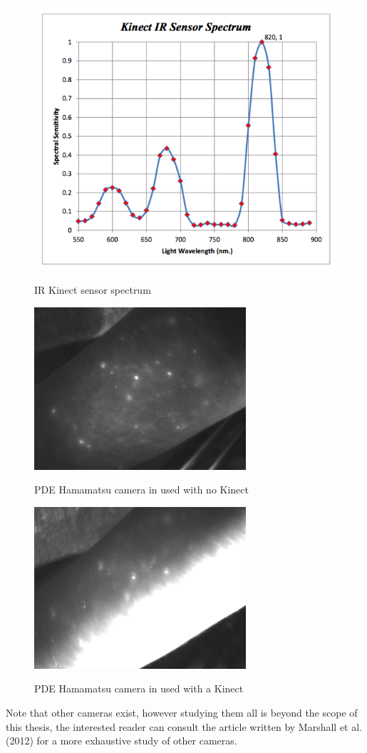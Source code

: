 \begin{figure}
\caption{IR Kinect sensor spectrum}
\centering
    \includegraphics[width=1.0\textwidth]{images/kinectSpectrum.png}
\label{fig:kinectSpectrum}
\end{figure}

\begin{figure}
\caption{PDE Hamamatsu camera in used with no Kinect}
\centering
    \includegraphics[width=0.7\textwidth]{images/PDEOK.png}
\label{fig:PDEOK}
\end{figure}

\begin{figure}
\caption{PDE Hamamatsu camera in used with a Kinect}
\centering
    \includegraphics[width=0.7\textwidth]{images/PDENotOK.png}
\label{fig:PDENotOK}
\end{figure}

Note that other cameras exist, however studying them all is beyond the scope of this thesis, the interested reader can consult the article written by Marshall et al. (2012) \cite{marshall_near-infrared_2010} for a more exhaustive study of other cameras.


